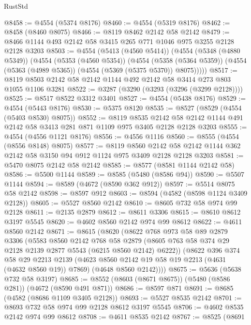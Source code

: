 \begin{lexlean}{RustStd}
\begin{coremodule}
{\begin{coremodule}
{{{{{{{{{{{{{{{{@8458 := @4554 (@5374 @8176)
@8460 := @4554 (@5319 @8176)
@8462 := @8458 (@8460 @8075)
@8466 := @8119 @8462 @2142 @58 @2142
@8479 := @8466 @1144 @493 @2142 @58 @3415 @265 @771 @1046 @975 @3255 @2128 @2128 @3203
@8503 := @4554
    (@5413 (@4560 @5414))
    (@4554
      (@5348 (@4880 @5349))
      (@4554
        (@5353 (@4560 @5354))
        (@4554
          (@5358 (@5364 @5359))
          (@4554 (@5363 (@4989 @5365)) (@4554 (@5369 (@5375 @5370)) @8075)))))
@8517 := @8119 @8503 @2142 @58 @2142 @1144 @492 @2142 @58 @3414 @273 @803 @1055 @1106 @3281
@8522 := @3287 (@3290 (@3293 (@3296 (@3299 @2128))))
@8525 := @8517 @8522 @3312 @3401
@8527 := @4554 (@5438 @8176)
@8529 := @4554 (@5443 @8176)
@8530 := @5375 @8120
@8535 := @8527 (@8529 (@4554 (@5403 @8530) @8075))
@8552 := @8119
    @8535
    @2142
    @58
    @2142
    @1144
    @491
    @2142
    @58
    @3413
    @281
    @871
    @1109
    @975
    @3405
    @2128
    @2128
    @3203
@8555 := @4554 (@4556 @1121 @8176)
@8556 := @4556 @1116
@8560 := @8555 (@4554 (@8556 @8148) @8075)
@8577 := @8119
    @8560
    @2142
    @58
    @2142
    @1144
    @362
    @2142
    @58
    @3150
    @94
    @912
    @1124
    @975
    @3409
    @2128
    @2128
    @3203
@8581 := @5470 @8075 @2142 @58 @2142
@8585 := @8577 (@8581 @1144 @2142 @58)
@8586 := @5500 @1144
@8589 := @8585 (@5480 (@8586 @94))
@8590 := @5507 @1144
@8594 := @8589 (@4672 (@8590 @362 @912))
@8597 := @5514 @8075 @58 @2142
@8598 := @8597 @912
@8603 := @8594 (@4582 (@8598 @1124 @3409 @2128))
@8605 := @5527 @8560 @2142
@8610 := @8605 @732 @58 @974 @99 @2128
@8611 := @2135 @2879
@8612 := @8611 @3306
@8615 := @8610 @8612 @3197 @5545
@8620 := @4602 @8560 @2142 @974 @99 @8612
@8622 := @4611 @8560 @2142
@8671 := @8615
    (@8620
      (@8622
        @768
        @973
        @58
        @89
        @2879
        @3306
        (@5583
          @8560
          @2142
          @768
          @58
          @2879
          (@8605 @763 @58 @374 @29 @2128 @2139 @2877 @5543 (@6215 @8560 @2142) @6222))
        (@8622
          @396
          @374
          @58
          @29
          @2213
          @2139
          (@4623 @8560 @2142 @19 @58 @19 @2213 (@4631 (@4632 @8560 @19)) @7869)
          (@4648 @8560 @2142))))
@8675 := @5636 (@5638 @732 @58 @3197)
@8685 := @8552 (@8603 (@8671 @8675)) (@5480 (@8586 @281)) (@4672 (@8590 @491 @871))
@8686 := @8597 @871
@8691 := @8685 (@4582 (@8686 @1109 @3405 @2128))
@8693 := @5527 @8535 @2142
@8701 := @8693 @732 @58 @974 @99 @2128 @8612 @3197 @5545
@8706 := @4602 @8535 @2142 @974 @99 @8612
@8708 := @4611 @8535 @2142
@8767 := @8525
    (@8691
}}}}}}}}}}}}}}}}
\end{coremodule}}
\end{coremodule}
\end{lexlean}
